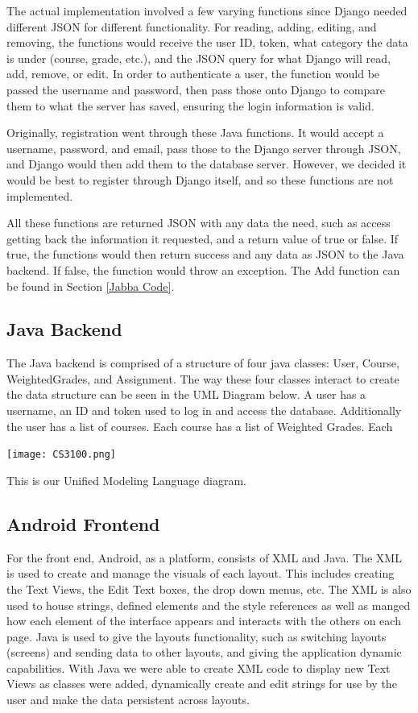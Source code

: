 \documentclass[a4paper]{article} %
\begin{document}
The actual implementation involved a few varying functions since Django needed different JSON for different functionality. For reading, adding, editing, and removing, the functions would receive the user ID, token, what category the data is under (course, grade, etc.), and the JSON query for what Django will read, add, remove, or edit. In order to authenticate a user, the function would be passed the username and password, then pass those onto Django to compare them to what the server has saved, ensuring the login information is valid.

Originally, registration went through these Java functions. It would accept a username, password, and email, pass those to the Django server through JSON, and Django would then add them to the database server. However, we decided it would be best to register through Django itself, and so these functions are not implemented.

All these functions are returned JSON with any data the need, such as access getting back the information it requested, and a return value of true or false. If true, the functions would then return success and any data as JSON to the Java backend. If false, the function would throw an exception. The Add function can be found in Section \ref{Jabba Code}.
\subsection{Java Backend}
The Java backend is comprised of a structure of four java classes: User, Course, WeightedGrades, and Assignment. The way these four classes interact to create the data structure can be seen in the UML Diagram below. A user has a username, an ID and token used to log in and access the database. Additionally the user has a list of courses. Each course has a list of Weighted Grades. Each 

\centerline{\texttt{[image: CS3100.png]}}
This is our Unified Modeling Language diagram.

\subsection{Android Frontend}
For the front end, Android, as a platform, consists of XML and Java. The XML is used to create and manage the visuals of each layout. This includes creating the Text Views, the Edit Text boxes, the drop down menus, etc. The XML is also used to house strings, defined elements and the style references as well as manged how each element of the interface appears and interacts with the others on each page. Java is used to give the layouts functionality, such as switching layouts (screens) and sending data to other layouts, and giving the application dynamic capabilities. With Java we were able to create XML code to display new Text Views as classes were added, dynamically create and edit strings for use by the user and make the data persistent across layouts.
\end{document}
